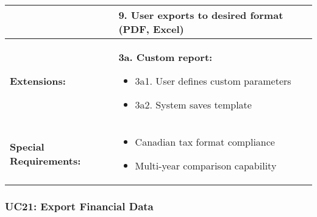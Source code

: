 \documentclass[12pt]{article}
\begin{document}
\begin{tabular}{|p{3cm}|p{11cm}|}
& 9. User exports to desired format (PDF, Excel) \\
\hline
\textbf{Extensions:} & 
\textbf{3a. Custom report:}
\begin{itemize}
    \item 3a1. User defines custom parameters
    \item 3a2. System saves template
\end{itemize} \\
\hline
\textbf{Special Requirements:} & 
\begin{itemize}
    \item Canadian tax format compliance
    \item Multi-year comparison capability
\end{itemize}
\hline
\end{tabular}


\subsubsection{UC21: Export Financial Data}
\end{document}
